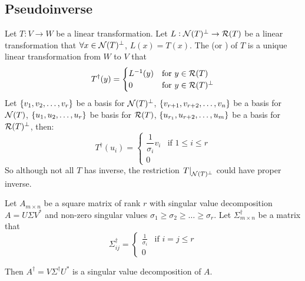 \subsection{Pseudoinverse}

\begin{definition}
    Let $T: V \rightarrow W$ be a linear transformation. Let $L: \mathcal{N}(T)^\bot \rightarrow \mathcal{R}(T)$ be a linear transformation that $\forall x \in \mathcal{N}(T)^\bot$, $L(x) = T(x)$. The  (or ) of $T$ is a unique linear transformation from $W$ to $V$ that
    \begin{equation}
        T^\dag (y) = \begin{cases}
            L^{-1}(y) & \text{for } y \in \mathcal{R}(T) \\
            0 & \text{for } y \in \mathcal{R}(T)^\bot
        \end{cases}
    \end{equation}
    Let $\set{v_1, v_2,\dots, v_r}$ be a basis for $\mathcal{N}(T)^\bot$, $\set{v_{r+1}, v_{r+2}, \dots, v_{n}}$ be a basis for $\mathcal{N}(T)$, $\set{u_1, u_2, \dots, u_r}$ be basis for $\mathcal{R}(T)$, $\set{u_{r_1}, u_{r+2}, \dots, u_m}$ be a basis for $\mathcal{R}(T)^\bot$, then:
    \begin{equation*}
        T^\dag (u_i) = \begin{cases}
            \dfrac{1}{\sigma_i} v_i & \text{if } 1 \leq i \leq r \\
            0
        \end{cases}
    \end{equation*}
    So although not all $T$ has inverse, the restriction $\mleft. T \mright|_{\nullspace{T}^\bot}$ could have proper inverse.
\end{definition}

\begin{theorem}
    Let $A_{m \times n}$ be a square matrix of rank $r$ with singular value decomposition $A = U \Sigma V^*$ and non-zero singular values $\sigma_1 \geq \sigma_2 \geq \dots \geq \sigma_r$. Let $\Sigma^\dag_{m \times n}$  be a matrix that 
    \begin{equation}
        \Sigma^\dag_{ij} = \begin{cases}
            \frac{1}{\sigma_i} & \text{if } i = j \leq r \\
            0 
        \end{cases}
    \end{equation}
    
    Then $A^\dag = V \Sigma^\dag U^*$ is a singular value decomposition of $A$.
\end{theorem}


